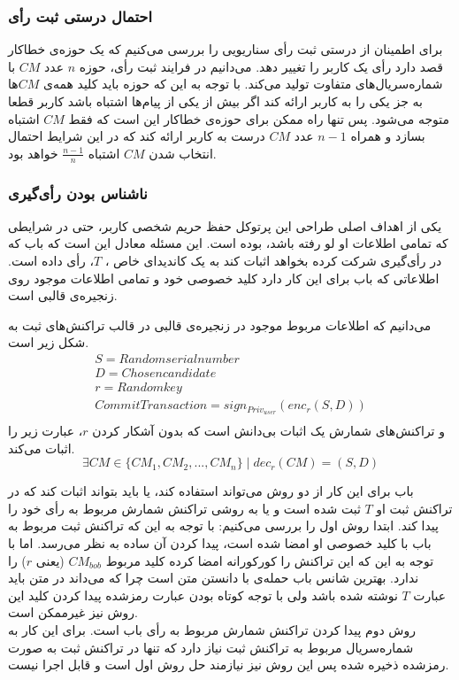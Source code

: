 \subsubsection{احتمال درستی ثبت رأی}
برای اطمینان از درستی ثبت رأی سناریویی را بررسی می‌کنیم که یک حوزه‌ی خطاکار قصد دارد رأی یک کاربر را تغییر دهد. می‌دانیم در فرایند ثبت رأی، حوزه $n$ عدد $CM$ با شماره‌سریال‌های متفاوت تولید می‌کند. با توجه‌ به این که حوزه باید کلید همه‌ی $CM$ها به جز یکی را به کاربر ارائه کند اگر بیش از یکی از پیام‌ها اشتباه باشد کاربر قطعا متوجه می‌شود. پس تنها راه ممکن برای حوزه‌ی خطاکار این است که فقط $CM$ اشتباه بسازد و همراه $n-1$ عدد $CM$ درست به کاربر ارائه کند که در این شرایط احتمال انتخاب شدن $CM$ اشتباه $\frac{n-1}{n}$ خواهد بود. 
\subsubsection{ناشناس بودن رأی‌گیری}
یکی از اهداف اصلی طراحی این پرتوکل حفظ حریم شخصی کاربر، حتی در شرایطی که تمامی اطلاعات او لو رفته باشد، بوده است. این مسئله معادل این است که باب که در رأی‌گیری شرکت کرده بخواهد اثبات کند به یک کاندیدای خاص ، $T$، رأی داده است. اطلاعاتی که باب برای این کار دارد کلید خصوصی خود و تمامی اطلاعات موجود روی زنجیره‌ی قالبی است. 
\par 
می‌دانیم که اطلاعات مربوط موجود در زنجیره‌ی قالبی در قالب تراکنش‌های ثبت به شکل زیر است.
	\begin{equation}
	\begin{matrix}


S = Random serial number\\
D = Chosen candidate\\
r = Random key\\
CommitTransaction = sign_{Priv_{user}} (enc_r(S,D)) \\

	\end{matrix}
\label{eq:commit}
\end{equation}
 و تراکنش‌های شمارش یک اثبات بی‌دانش است که بدون آشکار کردن $r$، عبارت زیر را اثبات می‌کند.
	\begin{equation}
\exists CM \in \{CM_1, CM_2, ..., CM_n\}  \mid dec_r(CM) = (S,D)
\label{eq:a}
\end{equation}


\par 
باب برای این کار از دو روش می‌تواند استفاده کند، یا باید بتواند اثبات کند که در تراکنش ثبت او $T$ ثبت شده است و یا به روشی تراکنش شمارش مربوط به رأی خود را پیدا کند. ابتدا روش اول را بررسی می‌کنیم: با توجه به این که تراکنش ثبت مربوط به باب با کلید خصوصی او امضا شده است، پیدا کردن آن ساده به نظر می‌رسد. اما با توجه به این که این تراکنش را کورکورانه امضا کرده کلید مربوط $CM_{bob}$ (یعنی $r$) را ندارد. بهترین شانس باب حمله‌ی با دانستن متن
 است چرا که می‌داند در متن باید عبارت $T$ نوشته شده باشد ولی با توجه کوتاه بودن عبارت رمزشده پیدا کردن کلید این روش نیز غیرممکن است. 
 \\
 روش دوم پیدا کردن تراکنش شمارش مربوط به رأی باب است. برای این کار به شماره‌سریال مربوط به تراکنش ثبت نیاز دارد که تنها در تراکنش ثبت به صورت رمزشده ذخیره شده پس این روش نیز نیازمند حل روش اول است و قابل اجرا نیست. 
